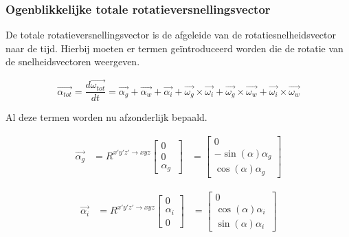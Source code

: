 \subsubsection{Ogenblikkelijke totale rotatieversnellingsvector}
De totale rotatieversnellingsvector is de afgeleide van de rotatiesnelheidsvector naar de tijd. Hierbij moeten er termen ge\"introduceerd worden die de rotatie van de snelheidsvectoren weergeven.

\begin{equation*}
\overrightarrow{\alpha_{tot}}=\frac{d\overrightarrow{\omega_{tot}}}{dt}=\overrightarrow{\alpha_{g}}+\overrightarrow{\alpha_{w}}+\overrightarrow{\alpha_{i}}+\overrightarrow{\omega_{g}}\times\overrightarrow{\omega_{i}}+\overrightarrow{\omega_{g}}\times\overrightarrow{\omega_{w}}+\overrightarrow{\omega_{i}}\times\overrightarrow{\omega_{w}}
\end{equation*}

Al deze termen worden nu afzonderlijk bepaald.

\begin{equation*}
\begin{split}
\overrightarrow{\alpha_{g}}&=R^{x'y'z' \rightarrow xyz}
	\begin{bmatrix}
	0\\
	0\\
	\alpha_{g}\
	\end{bmatrix}
	&=\begin{bmatrix}
	0\\
	-\sin(\alpha)\alpha_{g}\\
	\cos(\alpha)\alpha_{g}\
	\end{bmatrix}
\end{split}
\end{equation*}

\begin{equation*}
\begin{split}
\overrightarrow{\alpha_{i}}&=R^{x'y'z' \rightarrow xyz}
	\begin{bmatrix}
	0\\
	\alpha_{i}\\
	0\
	\end{bmatrix}
	&=\begin{bmatrix}
	0\\
	\cos(\alpha)\alpha_{i}\\
	\sin(\alpha)\alpha_{i}\
	\end{bmatrix}
\end{split}
\end{equation*}

